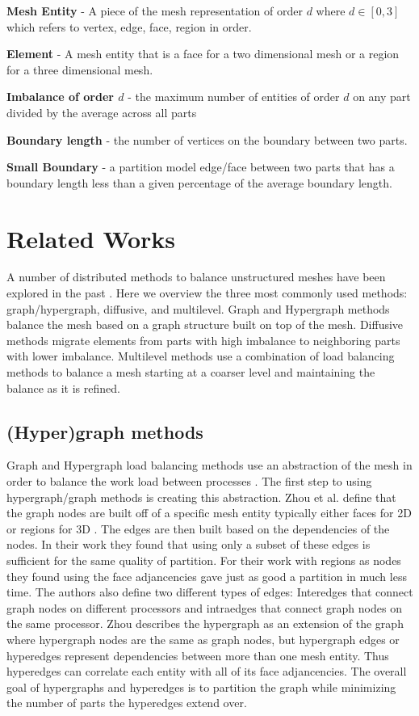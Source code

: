 \documentclass{thesis}
\begin{document}
{\bf Mesh Entity } - A piece of the mesh representation of order $d$ where $d \in [0,3]$ which refers to vertex, edge, face, region in order.

{\bf Element} - A mesh entity that is a face for a two dimensional mesh or a region for a three dimensional mesh.

{\bf Imbalance of order $d$} - the maximum number of entities of order $d$ on any part divided by the average across all parts

{\bf Boundary length} - the number of vertices on the boundary between two parts.

{\bf Small Boundary} - a partition model edge/face between two parts that has a boundary length less than a given percentage of the average boundary length.


\chapter{Related Works}
A number of distributed methods to balance unstructured meshes have been 
explored in the past \cite{multidiffuse,surveygraph}. Here we overview the 
three most commonly used methods: graph/hypergraph, diffusive, and multilevel. 
Graph and Hypergraph methods balance the mesh based on a graph structure built 
on top of the mesh. Diffusive methods migrate elements from parts with high 
imbalance to neighboring parts with lower imbalance. Multilevel methods use 
a combination of load balancing methods to balance a mesh starting at a 
coarser level and maintaining the balance as it is refined.

\section{(Hyper)graph methods}
Graph and Hypergraph load balancing methods use an abstraction of the mesh in 
order to balance the work load between processes \cite{surveygraph}. The 
first step to using 
hypergraph/graph methods is creating this abstraction. Zhou et al. define that 
the graph nodes are built off of a specific mesh entity typically either faces 
for 2D or regions for 3D \cite{zhougraph}. The edges are then built based on the
dependencies of the nodes. In their work they found that using only a subset of 
these edges is sufficient for the same quality of partition. For their work with
regions as nodes they found using the face adjancencies gave just as good a 
partition in much less time. The authors also define two different types of 
edges: Interedges that connect graph nodes on different processors and 
intraedges that connect graph nodes on the same processor. Zhou describes the 
hypergraph as an extension of the graph where hypergraph nodes are the same as 
graph nodes, but hypergraph edges or hyperedges represent dependencies between 
more than one mesh entity. Thus hyperedges can correlate each entity with all 
of its face adjancencies. The overall goal of hypergraphs and hyperedges is to 
partition the graph while minimizing the number of parts the hyperedges extend 
over.
\end{document}

